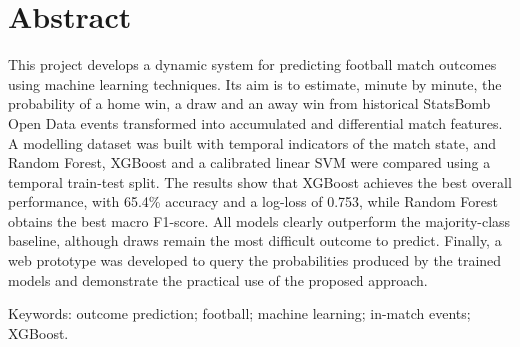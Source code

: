 \chapter{Abstract}
This project develops a dynamic system for predicting football match outcomes using machine learning techniques. Its aim is to estimate, minute by minute, the probability of a home win, a draw and an away win from historical StatsBomb Open Data events transformed into accumulated and differential match features. A modelling dataset was built with temporal indicators of the match state, and Random Forest, XGBoost and a calibrated linear SVM were compared using a temporal train-test split. The results show that XGBoost achieves the best overall performance, with 65.4\% accuracy and a log-loss of 0.753, while Random Forest obtains the best macro F1-score. All models clearly outperform the majority-class baseline, although draws remain the most difficult outcome to predict. Finally, a web prototype was developed to query the probabilities produced by the trained models and demonstrate the practical use of the proposed approach.

Keywords: outcome prediction; football; machine learning; in-match events; XGBoost.

